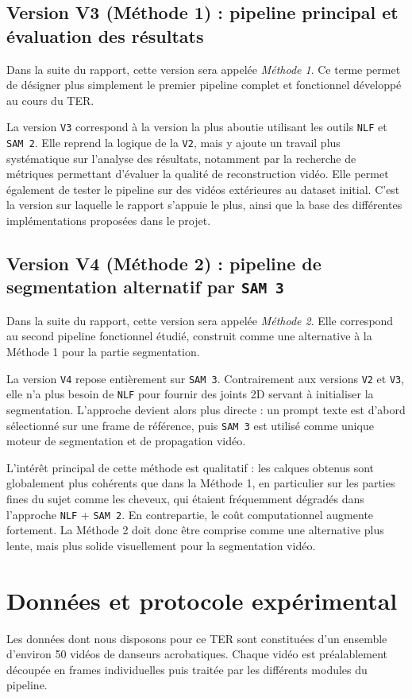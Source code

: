 \documentclass[11pt,a4paper]{article}
\begin{document}
\subsection{Version V3 (Méthode 1) : pipeline principal et évaluation des résultats}
Dans la suite du rapport, cette version sera appelée \textit{Méthode 1}. Ce terme permet de désigner plus simplement le premier pipeline complet et fonctionnel développé au cours du TER.

La version \texttt{V3} correspond à la version la plus aboutie utilisant les outils \texttt{NLF} et \texttt{SAM 2}.
Elle reprend la logique de la \texttt{V2}, mais y ajoute un travail plus systématique sur l'analyse des résultats, notamment par la recherche de métriques permettant d'évaluer la qualité de reconstruction vidéo.
Elle permet également de tester le pipeline sur des vidéos extérieures au dataset initial.
C'est la version sur laquelle le rapport s'appuie le plus, ainsi que la base des différentes implémentations proposées dans le projet.

\subsection{Version V4 (Méthode 2) : pipeline de segmentation alternatif par \texttt{SAM 3}}
Dans la suite du rapport, cette version sera appelée \textit{Méthode 2}. Elle correspond au second pipeline fonctionnel étudié, construit comme une alternative à la Méthode 1 pour la partie segmentation.

\newpage %
La version \texttt{V4} repose entièrement sur \texttt{SAM 3}.
Contrairement aux versions \texttt{V2} et \texttt{V3}, elle n'a plus besoin de \texttt{NLF} pour fournir des joints 2D servant à initialiser la segmentation.
L'approche devient alors plus directe : un prompt texte est d'abord sélectionné sur une frame de référence, puis \texttt{SAM 3} est utilisé comme unique moteur de segmentation et de propagation vidéo.

L'intérêt principal de cette méthode est qualitatif : les calques obtenus sont globalement plus cohérents que dans la Méthode 1, en particulier sur les parties fines du sujet comme les cheveux, qui étaient fréquemment dégradés dans l'approche \texttt{NLF} + \texttt{SAM 2}.
En contrepartie, le coût computationnel augmente fortement.
La Méthode 2 doit donc être comprise comme une alternative plus lente, mais plus solide visuellement pour la segmentation vidéo.

\section{Données et protocole expérimental}
Les données dont nous disposons pour ce TER sont constituées d'un ensemble d'environ 50 vidéos de danseurs acrobatiques.
Chaque vidéo est préalablement découpée en frames individuelles puis traitée par les différents modules du pipeline.
\end{document}
